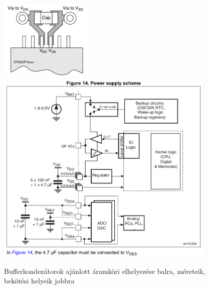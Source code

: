 \documentclass[../main.tex]{subfiles}
\begin{document}
            \begin{figure}[h!]
                \centering
                    \includegraphics[width=4.5cm]{resources/pcb_res/decoup_cap.png}
                    \includegraphics[width=10.5cm]{resources/pcb_res/power_sup_capacitors.png}
                \caption{Bufferkondezátorok ajánlott áramköri elhelyezése balra\cite{an2586}, méreteik, bekötési helyeik jobbra\cite{ds_stm32}}
                \label{fig:decoupling_cap}
            \end{figure}
            
            
            
\end{document}
